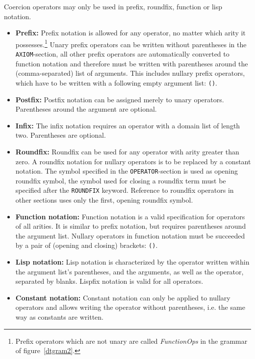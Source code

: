 \begin{description}
Coercion operators may only be used in prefix, roundfix, function or lisp notation.

\begin{itemize}
\item{{\bf Prefix:}} Prefix notation is allowed for any operator, no matter
which arity it possesses.\footnote{Prefix operators which are not unary are called
{\em FunctionOps} in the grammar of figure~\ref{dtgram2}.}
Unary prefix operators can be written without parentheses
in the {\tt AXIOM}-section, all other prefix operators are automatically converted
to function notation and therefore must be written with
parentheses around the (comma-separated) list of arguments. This includes
nullary prefix operators, which have to be written with a following empty
argument list: \verb|()|.

\item{{\bf Postfix:}} Postfix notation can be assigned merely to unary operators.
Parentheses around the argument are optional.

\item{{\bf Infix:}} The infix notation requires an operator with a domain list of length
two. Parentheses are optional.

\item{{\bf Roundfix:}} Roundfix can be used for any operator with
arity greater than zero. A roundfix notation for nullary operators
is to be replaced by a constant notation. The symbol specified in the
{\tt OPERATOR}-section is used as opening roundfix symbol, the
symbol used for closing a roundfix term must be specified after the {\tt ROUNDFIX}
keyword. Reference to roundfix operators in other sections uses
only the first, opening roundfix symbol.

\item{{\bf Function notation:}} Function notation is a valid specification for
operators of all arities. It is similar to prefix notation, but requires
parentheses around the argument list. Nullary operators in function notation
must be succeeded by a pair of (opening and closing) brackets: \verb|()|.

\item{{\bf Lisp notation:}} Lisp notation is characterized by the operator
written within the argument list's parentheses, and the arguments,
as well as the operator, separated by blanks. Lispfix notation is valid
for all operators.

\item{{\bf Constant notation:}} Constant notation can only be applied to nullary
operators and allows writing the operator without parentheses, i.e.
the same way as constants are written.
\end{itemize}


\end{description}
